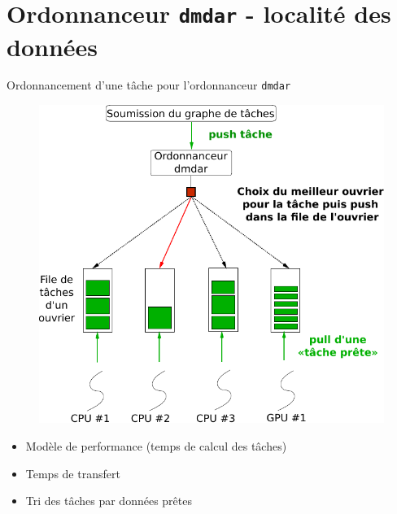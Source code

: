 \documentclass[9pt]{beamer}
\begin{document}
\section{Ordonnanceur \texttt{dmdar} - localité des données}

\begin{frame}{\textcolor{inriaGrey}{Ordonnancement d'une tâche pour l'ordonnanceur \texttt{dmdar}}}
  \begin{minipage}{0.65\textwidth}
    \begin{figure}
      \centering
      \includegraphics[width=1\linewidth]{img/sched_dmdar.pdf}
    \end{figure}
  \end{minipage} \hfill
  \begin{minipage}{0.3\textwidth}
    \begin{itemize}
    \item Modèle de performance (temps de calcul des tâches)
    \item Temps de transfert
    \item Tri des tâches par données prêtes
    \end{itemize}
  \end{minipage}
\end{frame}
\end{document}
